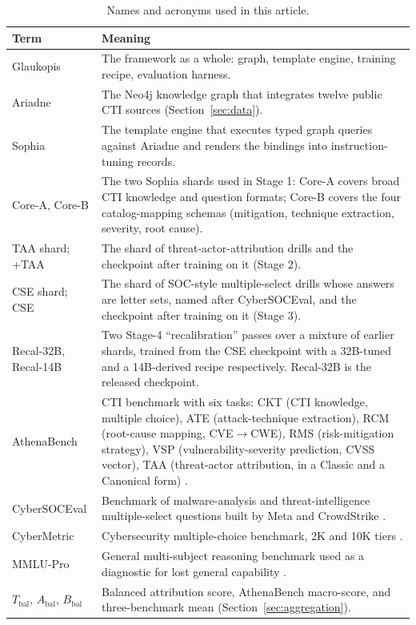 \documentclass[twocolumn]{svjour3}
\newcommand{\Abal}{A_{\mathrm{bal}}}
\newcommand{\Bbal}{B_{\mathrm{bal}}}
\newcommand{\Tbal}{T_{\mathrm{bal}}}
\begin{document}
\begin{table}
\centering\footnotesize
\caption{Names and acronyms used in this article.}\label{tab:glossary}
\begin{tabularx}{\textwidth}{@{}p{3.2cm}X@{}}
\toprule Term & Meaning \\\midrule
Glaukopis & The framework as a whole: graph, template engine, training recipe, evaluation harness. \\
Ariadne & The Neo4j knowledge graph that integrates twelve public CTI sources (Section~\ref{sec:data}). \\
Sophia & The template engine that executes typed graph queries against Ariadne and renders the bindings into instruction-tuning records. \\
Core-A, Core-B & The two Sophia shards used in Stage 1: Core-A covers broad CTI knowledge and question formats; Core-B covers the four catalog-mapping schemas (mitigation, technique extraction, severity, root cause). \\
TAA shard; +TAA & The shard of threat-actor-attribution drills and the checkpoint after training on it (Stage 2). \\
CSE shard; CSE & The shard of SOC-style multiple-select drills whose answers are letter sets, named after CyberSOCEval, and the checkpoint after training on it (Stage 3). \\
Recal-32B, Recal-14B & Two Stage-4 ``recalibration'' passes over a mixture of earlier shards, trained from the CSE checkpoint with a 32B-tuned and a 14B-derived recipe respectively. Recal-32B is the released checkpoint. \\
AthenaBench & CTI benchmark with six tasks: CKT (CTI knowledge, multiple choice), ATE (attack-technique extraction), RCM (root-cause mapping, CVE$\to$CWE), RMS (risk-mitigation strategy), VSP (vulnerability-severity prediction, CVSS vector), TAA (threat-actor attribution, in a Classic and a Canonical form) \cite{alam2025athenabench}. \\
CyberSOCEval & Benchmark of malware-analysis and threat-intelligence multiple-select questions built by Meta and CrowdStrike \cite{deason2025cybersoceval}. \\
CyberMetric & Cybersecurity multiple-choice benchmark, 2K and 10K tiers \cite{tihanyi2024cybermetric}. \\
MMLU-Pro & General multi-subject reasoning benchmark used as a diagnostic for lost general capability \cite{wang2024mmlupro}. \\
$\Tbal$, $\Abal$, $\Bbal$ & Balanced attribution score, AthenaBench macro-score, and three-benchmark mean (Section~\ref{sec:aggregation}). \\
\bottomrule
\end{tabularx}
\end{table}
\end{document}
